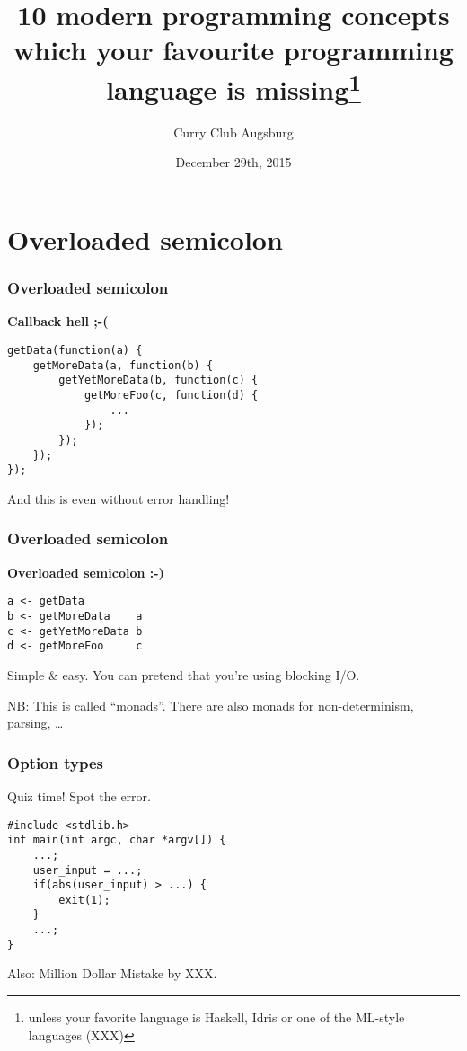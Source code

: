 \documentclass[14pt,compress,english,utf8,t]{beamer}
\title[10 modern programming concepts]{10 modern programming concepts \\ which
your favourite programming language is missing\footnote{unless your favorite
language is Haskell, Idris or one of the ML-style languages (XXX)}}
\author{Curry Club Augsburg}
\institute{32th Chaos Communication Congress}
\date{December 29th, 2015}
\begin{document}
\frame{
  \titlepage
}


\section{Overloaded semicolon}

\begin{frame}[fragile]\frametitle{Overloaded semicolon}
  \vspace*{-1.5em}
  \begin{center}
    \Huge \textbf{Callback hell ;-(}
  \end{center}

  \begin{verbatim}
getData(function(a) {
    getMoreData(a, function(b) {
        getYetMoreData(b, function(c) {
            getMoreFoo(c, function(d) {
                ...
            });
        });
    });
});
  \end{verbatim}

  \pause
  And this is even without error handling!
\end{frame}

\begin{frame}[fragile]\frametitle{Overloaded semicolon}
  \vspace*{-1.5em}
  \begin{center}
    \Huge \textbf{Overloaded semicolon :-)}
  \end{center}

  \begin{verbatim}
a <- getData
b <- getMoreData    a
c <- getYetMoreData b
d <- getMoreFoo     c
  \end{verbatim}

  Simple \& easy. You can pretend that you're using blocking I/O.
  \medskip

  \pause
  NB: This is called ``monads''. There are also monads for non-determinism,
  parsing, \ldots
\end{frame}

\begin{frame}[fragile]\frametitle{Option types}
  \vspace*{-1.5em}
  \begin{center}
    \huge Quiz time! Spot the error.
  \end{center}

  \begin{verbatim}
#include <stdlib.h>
int main(int argc, char *argv[]) {
    ...;
    user_input = ...;
    if(abs(user_input) > ...) {
        exit(1);
    }
    ...;
}
  \end{verbatim}
  \pause

  Also: Million Dollar Mistake by XXX.
\end{frame}
\end{document}
